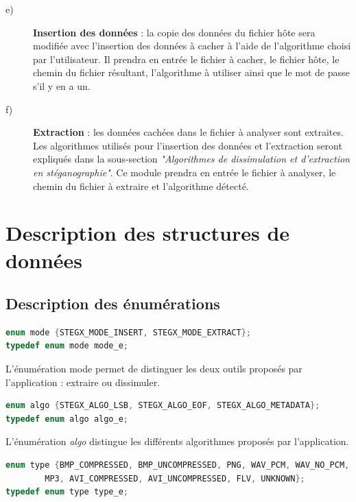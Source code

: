 \documentclass[11pt]{article}
\begin{document}
\begin{description}
\item[e)] \textbf{Insertion des données} : la copie des données du fichier hôte
    sera modifiée avec l'insertion des données à cacher à l'aide de l'algorithme
    choisi par l'utilisateur. 
    Il prendra en entrée le fichier à cacher, le fichier hôte, le chemin du 
    fichier résultant, l'algorithme à utiliser ainsi que le mot de passe 
    s'il y en a un. 

\item[f)] \textbf{Extraction} : les données cachées dans le fichier à analyser
    sont extraites. Les algorithmes utilisés pour l'insertion des données 
    et l'extraction seront expliqués dans la sous-section \textit{"Algorithmes 
    de dissimulation et d'extraction en stéganographie"}. 
    Ce module prendra en entrée le fichier à analyser, le chemin du fichier 
    à extraire et l'algorithme détecté. 

\end{description}

\newpage

\section{Description des structures de données}

\subsection{Description des énumérations}

\begin{lstlisting}[language=c]
enum mode {STEGX_MODE_INSERT, STEGX_MODE_EXTRACT};
typedef enum mode mode_e;
\end{lstlisting}

L'énumération mode permet de distinguer les deux outils proposés par 
l'application : extraire ou dissimuler. 
\newline

\begin{lstlisting}[language=c]
enum algo {STEGX_ALGO_LSB, STEGX_ALGO_EOF, STEGX_ALGO_METADATA};
typedef enum algo algo_e;
\end{lstlisting}

L'énumération \textit{algo} distingue les différents algorithmes proposés par 
l'application. 
\newline 

\begin{lstlisting}[language=c]
enum type {BMP_COMPRESSED, BMP_UNCOMPRESSED, PNG, WAV_PCM, WAV_NO_PCM, 
        MP3, AVI_COMPRESSED, AVI_UNCOMPRESSED, FLV, UNKNOWN};
typedef enum type type_e;
\end{lstlisting}
\end{document}
